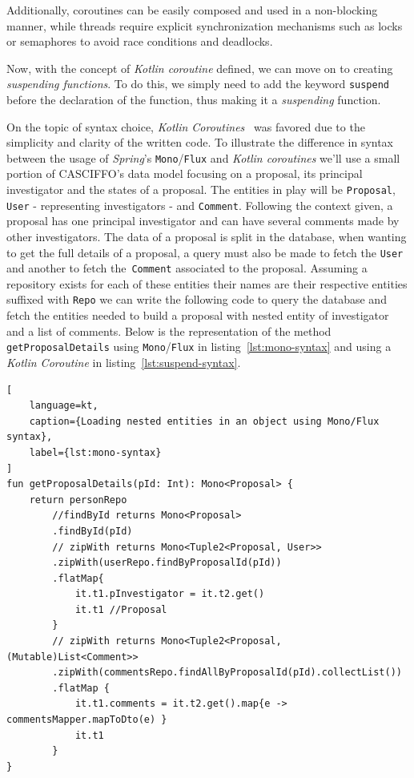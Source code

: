 Additionally, coroutines can be easily composed and used in a non-blocking manner, while threads require explicit synchronization mechanisms such as locks or semaphores to avoid race conditions and deadlocks.

Now, with the concept of \textit{Kotlin coroutine} defined, we can move on to creating \textit{suspending functions}. 
To do this, we simply need to add the keyword \texttt{suspend} before the declaration of the function, thus making it a \textit{suspending} function.

On the topic of syntax choice, \textit{Kotlin Coroutines}~\cite{kotlin-coroutines} was favored due to the simplicity and clarity of the written code.
To illustrate the difference in syntax between the usage of \textit{Spring}'s \texttt{Mono}/\texttt{Flux} and \textit{Kotlin coroutines} we'll use a small portion of CASCIFFO's data model focusing on a proposal, its principal investigator and the states of a proposal. The entities in play will be \lstinline{Proposal}, \lstinline{User} - representing investigators - and \lstinline{Comment}. Following the context given, a proposal has one principal investigator and can have several comments made by other investigators. The data of a proposal is split in the database, when wanting to get the full details of a proposal, a query must also be made to fetch the \lstinline{User} and another to fetch the~\lstinline{Comment} associated to the proposal. Assuming a repository exists for each of these entities their names are their respective entities suffixed with \lstinline{Repo} we can write the following code to query the database and fetch the entities needed to build a proposal with nested entity of investigator and a list of comments.
Below is the representation of the method \lstinline{getProposalDetails} using \texttt{Mono}/\texttt{Flux} in listing~\ref{lst:mono-syntax} and using a \textit{Kotlin Coroutine} in listing~\ref{lst:suspend-syntax}.

\begin{lstlisting}[
    language=kt, 
    caption={Loading nested entities in an object using Mono/Flux syntax}, 
    label={lst:mono-syntax}
]
fun getProposalDetails(pId: Int): Mono<Proposal> {
    return personRepo
        //findById returns Mono<Proposal>
        .findById(pId) 
        // zipWith returns Mono<Tuple2<Proposal, User>>
        .zipWith(userRepo.findByProposalId(pId)) 
        .flatMap{ 
            it.t1.pInvestigator = it.t2.get()
            it.t1 //Proposal
        }
        // zipWith returns Mono<Tuple2<Proposal, (Mutable)List<Comment>>
        .zipWith(commentsRepo.findAllByProposalId(pId).collectList()) 
        .flatMap {
            it.t1.comments = it.t2.get().map{e ->  commentsMapper.mapToDto(e) }
            it.t1
        }
}    
\end{lstlisting}



